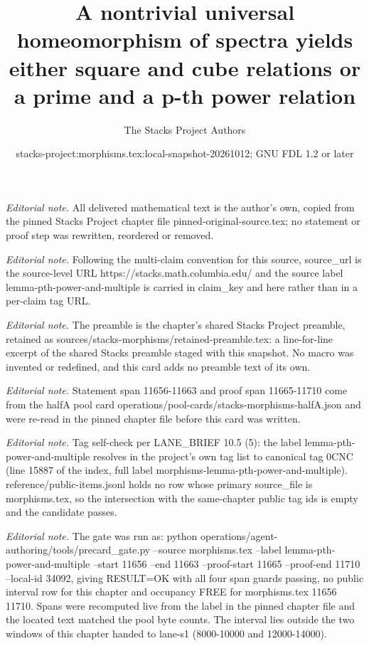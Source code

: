 \documentclass[10pt,a4paper]{amsart}
\title{A nontrivial universal homeomorphism of spectra yields either square and cube relations or a prime and a p-th power relation}
\author{The Stacks Project Authors}
\date{stacks-project:morphisms.tex:local-snapshot-20261012; GNU FDL 1.2 or later}
\theoremstyle{plain}
\theoremstyle{definition}
\theoremstyle{remark}
\numberwithin{equation}{subsection}
\begin{document}
\maketitle
\noindent\textit{Editorial note.} All delivered mathematical text is the author's own, copied from the pinned Stacks Project chapter file pinned-original-source.tex; no statement or proof step was rewritten, reordered or removed.\par\medskip
\noindent\textit{Editorial note.} Following the multi-claim convention for this source, source\_url is the source-level URL https://stacks.math.columbia.edu/ and the source label lemma-pth-power-and-multiple is carried in claim\_key and here rather than in a per-claim tag URL.\par\medskip
\noindent\textit{Editorial note.} The preamble is the chapter's shared Stacks Project preamble, retained as sources/stacks-morphisms/retained-preamble.tex: a line-for-line excerpt of the shared Stacks preamble staged with this snapshot. No macro was invented or redefined, and this card adds no preamble text of its own.\par\medskip
\noindent\textit{Editorial note.} Statement span 11656-11663 and proof span 11665-11710 come from the halfA pool card operations/pool-cards/stacks-morphisms-halfA.json and were re-read in the pinned chapter file before this card was written.\par\medskip
\noindent\textit{Editorial note.} Tag self-check per LANE\_BRIEF 10.5 (5): the label lemma-pth-power-and-multiple resolves in the project's own tag list to canonical tag 0CNC (line 15887 of the index, full label morphisms-lemma-pth-power-and-multiple). reference/public-items.jsonl holds no row whose primary source\_file is morphisms.tex, so the intersection with the same-chapter public tag ids is empty and the candidate passes.\par\medskip
\noindent\textit{Editorial note.} The gate was run as: python operations/agent-authoring/tools/precard\_gate.py --source morphisms.tex --label lemma-pth-power-and-multiple --start 11656 --end 11663 --proof-start 11665 --proof-end 11710 --local-id 34092, giving RESULT=OK with all four span guards passing, no public interval row for this chapter and occupancy FREE for morphisms.tex 11656 11710. Spans were recomputed live from the label in the pinned chapter file and the located text matched the pool byte counts. The interval lies outside the two windows of this chapter handed to lane-s1 (8000-10000 and 12000-14000).\par\medskip
\end{document}
